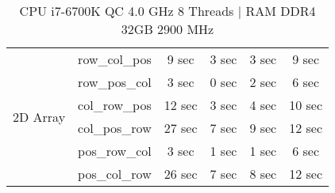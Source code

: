 \documentclass[11pt]{article}
\begin{document}
\begin{table}[H]
\begin{tabular}{ |c|c|c|c|c|c|  }
\hline
\multirow{6}{*}{2D Array}   & row\_col\_pos & 9 sec & 3 sec & 3 sec & 9 sec \\
                            & row\_pos\_col & 3 sec & 0 sec & 2 sec & 6 sec \\
                            & col\_row\_pos & 12 sec & 3 sec & 4 sec & 10 sec \\  
                            & col\_pos\_row & 27 sec & 7 sec & 9 sec & 12 sec \\
                            & pos\_row\_col & 3 sec & 1 sec & 1 sec & 6 sec \\
                            & pos\_col\_row & 26 sec & 7 sec & 8 sec & 12 sec \\
\hline
\end{tabular}
\caption{CPU i7-6700K QC 4.0 GHz 8 Threads $|$ RAM DDR4 32GB 2900 MHz }
\end{table}
\end{document}
